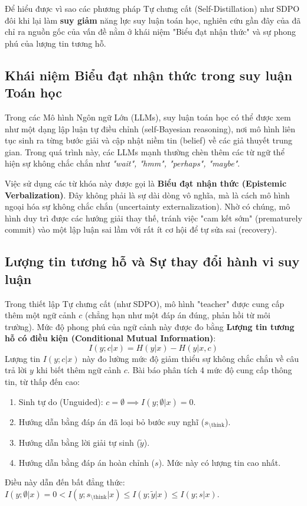 \documentclass[12pt,a4paper]{report}
\begin{document}
Để hiểu được vì sao các phương pháp Tự chưng cất (Self-Distillation) như SDPO đôi khi lại làm \textbf{suy giảm} năng lực suy luận toán học, nghiên cứu gần đây của \cite{kim2026degrade} đã chỉ ra nguồn gốc của vấn đề nằm ở khái niệm "Biểu đạt nhận thức" và sự phong phú của lượng tin tương hỗ.

\subsection{Khái niệm Biểu đạt nhận thức trong suy luận Toán học}
Trong các Mô hình Ngôn ngữ Lớn (LLMs), suy luận toán học có thể được xem như một dạng lập luận tự điều chỉnh (self-Bayesian reasoning), nơi mô hình liên tục sinh ra từng bước giải và cập nhật niềm tin (belief) về các giả thuyết trung gian. Trong quá trình này, các LLMs mạnh thường chèn thêm các từ ngữ thể hiện sự không chắc chắn như \textit{"wait", "hmm", "perhaps", "maybe"}. 

Việc sử dụng các từ khóa này được gọi là \textbf{Biểu đạt nhận thức (Epistemic Verbalization)}. Đây không phải là sự dài dòng vô nghĩa, mà là cách mô hình ngoại hóa sự không chắc chắn (uncertainty externalization). Nhờ có chúng, mô hình duy trì được các hướng giải thay thế, tránh việc "cam kết sớm" (prematurely commit) vào một lập luận sai lầm với rất ít cơ hội để tự sửa sai (recovery).

\subsection{Lượng tin tương hỗ và Sự thay đổi hành vi suy luận}
Trong thiết lập Tự chưng cất (như SDPO), mô hình "teacher" được cung cấp thêm một ngữ cảnh $c$ (chẳng hạn như một đáp án đúng, phản hồi từ môi trường). Mức độ phong phú của ngữ cảnh này được đo bằng \textbf{Lượng tin tương hỗ có điều kiện (Conditional Mutual Information)}:
\begin{equation}
    I(y; c | x) = H(y | x) - H(y | x, c)
\end{equation}
Lượng tin $I(y; c|x)$ này đo lường mức độ giảm thiểu sự không chắc chắn về câu trả lời $y$ khi biết thêm ngữ cảnh $c$. Bài báo \cite{kim2026degrade} phân tích 4 mức độ cung cấp thông tin, từ thấp đến cao:
\begin{enumerate}
    \item Sinh tự do (Unguided): $c = \emptyset \implies I(y; \emptyset | x) = 0$.
    \item Hướng dẫn bằng đáp án đã loại bỏ bước suy nghĩ ($s_{\setminus\text{think}}$).
    \item Hướng dẫn bằng lời giải tự sinh ($\tilde{y}$).
    \item Hướng dẫn bằng đáp án hoàn chỉnh ($s$). Mức này có lượng tin cao nhất.
\end{enumerate}
Điều này dẫn đến bất đẳng thức: $I(y; \emptyset | x) = 0 < I(y; s_{\setminus\text{think}} | x) \le I(y; \tilde{y} | x) \le I(y; s | x)$.
\end{document}
